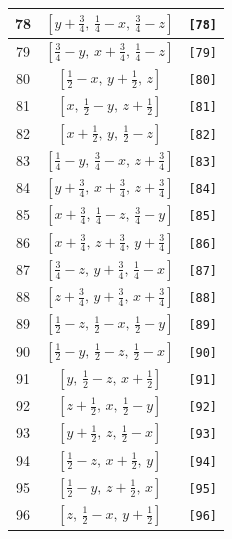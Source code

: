 \documentclass[fleqn,8pt]{jsarticle}
\begin{document}
\begin{longtable}{ccc}
78 & $\left[ y + \frac{3}{4},\, \frac{1}{4} - x,\, \frac{3}{4} - z \right]$ & {\tt [78]} \\ \hline
79 & $\left[ \frac{3}{4} - y,\, x + \frac{3}{4},\, \frac{1}{4} - z \right]$ & {\tt [79]} \\ \hline
80 & $\left[ \frac{1}{2} - x,\, y + \frac{1}{2},\, z \right]$ & {\tt [80]} \\ \hline
81 & $\left[ x,\, \frac{1}{2} - y,\, z + \frac{1}{2} \right]$ & {\tt [81]} \\ \hline
82 & $\left[ x + \frac{1}{2},\, y,\, \frac{1}{2} - z \right]$ & {\tt [82]} \\ \hline
83 & $\left[ \frac{1}{4} - y,\, \frac{3}{4} - x,\, z + \frac{3}{4} \right]$ & {\tt [83]} \\ \hline
84 & $\left[ y + \frac{3}{4},\, x + \frac{3}{4},\, z + \frac{3}{4} \right]$ & {\tt [84]} \\ \hline
85 & $\left[ x + \frac{3}{4},\, \frac{1}{4} - z,\, \frac{3}{4} - y \right]$ & {\tt [85]} \\ \hline
86 & $\left[ x + \frac{3}{4},\, z + \frac{3}{4},\, y + \frac{3}{4} \right]$ & {\tt [86]} \\ \hline
87 & $\left[ \frac{3}{4} - z,\, y + \frac{3}{4},\, \frac{1}{4} - x \right]$ & {\tt [87]} \\ \hline
88 & $\left[ z + \frac{3}{4},\, y + \frac{3}{4},\, x + \frac{3}{4} \right]$ & {\tt [88]} \\ \hline
89 & $\left[ \frac{1}{2} - z,\, \frac{1}{2} - x,\, \frac{1}{2} - y \right]$ & {\tt [89]} \\ \hline
90 & $\left[ \frac{1}{2} - y,\, \frac{1}{2} - z,\, \frac{1}{2} - x \right]$ & {\tt [90]} \\ \hline
91 & $\left[ y,\, \frac{1}{2} - z,\, x + \frac{1}{2} \right]$ & {\tt [91]} \\ \hline
92 & $\left[ z + \frac{1}{2},\, x,\, \frac{1}{2} - y \right]$ & {\tt [92]} \\ \hline
93 & $\left[ y + \frac{1}{2},\, z,\, \frac{1}{2} - x \right]$ & {\tt [93]} \\ \hline
94 & $\left[ \frac{1}{2} - z,\, x + \frac{1}{2},\, y \right]$ & {\tt [94]} \\ \hline
95 & $\left[ \frac{1}{2} - y,\, z + \frac{1}{2},\, x \right]$ & {\tt [95]} \\ \hline
96 & $\left[ z,\, \frac{1}{2} - x,\, y + \frac{1}{2} \right]$ & {\tt [96]} \\
\end{longtable}
\end{document}
